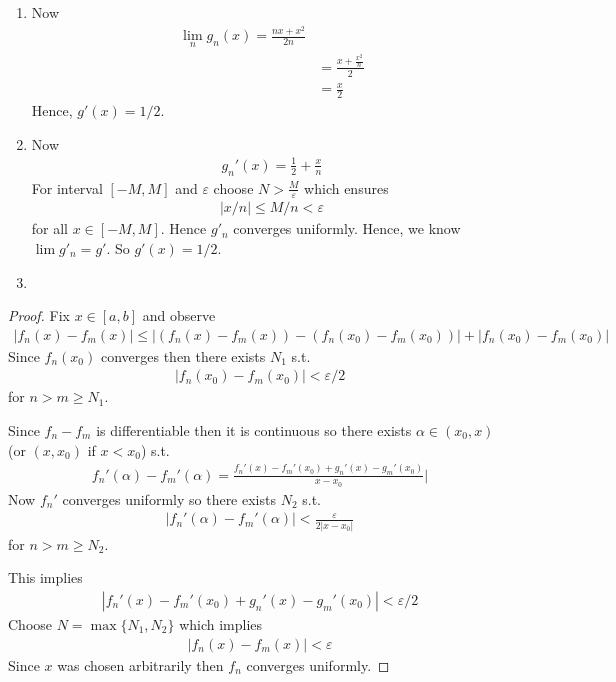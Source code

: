 \begin{enumerate}[label=(\alph*)]
    \item 
    Now 
    \begin{align*}
        \lim_n g_n(x) = \frac{nx+x^2}{2n} \\
        &= \frac{x+\frac{x^2}{n}}{2} \\
        &= \frac{x}{2}
    \end{align*}
    Hence, $g'(x)=1/2$.

    \item
    Now
    \begin{align*}
        g_n'(x) = \frac{1}{2} + \frac{x}{n}
    \end{align*}
    For interval $[-M,M]$ and $\varepsilon$ choose $N>\frac{M}{\varepsilon}$
    which ensures
    \begin{align*}
        |x/n| \leq M/n < \varepsilon
    \end{align*}
    for all $x\in [-M,M]$. Hence $g'_n$ converges uniformly. 
    Hence, we know $\lim g'_n = g'$. So $g'(x)=1/2$.

    \item

\end{enumerate}

\begin{proof}
    Fix $x\in [a,b]$ and observe
    \begin{align*}
        |f_n(x) - f_m(x)| \leq |(f_n(x) - f_m(x)) - (f_n(x_0) - f_m(x_0))| + |f_n(x_0) - f_m(x_0)|
    \end{align*}
    Since $f_n(x_0)$ converges then there exists $N_1$ s.t. 
    \begin{align*}
        |f_n(x_0) - f_m(x_0)| < \varepsilon/2
    \end{align*}
    for $n>m\geq N_1$.

    Since $f_n-f_m$ is differentiable then it is continuous so 
    there exists $\alpha \in (x_0,x)$ (or $(x,x_0)$ if $x<x_0$) s.t. 
    \begin{align*}
        f_n'(\alpha) - f_m'(\alpha) = \frac{f_n'(x) - f_m'(x_0) + g_n'(x) - g_m'(x_0)}{x-x_0}|
    \end{align*}
    Now $f_n'$ converges uniformly so there exists $N_2$ s.t. 
    \begin{align*}
        |f_n'(\alpha) - f_m'(\alpha)| < \frac{\varepsilon}{2|x-x_0|}
    \end{align*}
    for $n>m\geq N_2$.

    This implies
    \begin{align*}
        |f_n'(x) - f_m'(x_0) + g_n'(x) - g_m'(x_0)| < \varepsilon/2
    \end{align*}
    Choose $N=\max\{N_1,N_2\}$ which implies 
    \begin{align*}
        |f_n(x) - f_m(x)| < \varepsilon
    \end{align*}
    Since $x$ was chosen arbitrarily then $f_n$ converges uniformly.
\end{proof}